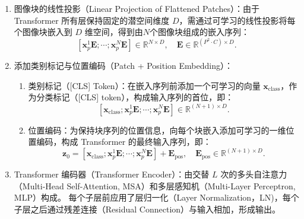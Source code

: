 \begin{enumerate}[label={（\arabic*）}, leftmargin=2em, labelsep=0.5em, itemsep=0pt]
该二维块序列经下述线性投影、类别标记与位置编码处理后，才构成 Transformer 编码器的实际输入 $\boldsymbol{z}_0$。
    \item 图像块的线性投影（Linear Projection of Flattened Patches）：由于 Transformer 所有层保持固定的潜空间维度 $D$，需通过可学习的线性投影将每个图像块嵌入到 $D$ 维空间，得到由$N$个图像块组成的嵌入序列：
    \begin{equation}
        \left[\boldsymbol{x}_p^1 \boldsymbol{E}; \cdots ; \boldsymbol{x}_p^N \boldsymbol{E}\right] \in \mathbb{R}^{N \times D}, \quad \boldsymbol{E} \in \mathbb{R}^{(P^2 \cdot C) \times D}.
    \end{equation}
    \item 添加类别标记与位置编码（Patch + Position Embedding）：
    \begin{enumerate}[label={（\alph*）}, leftmargin=2em, labelsep=0.5em, itemsep=0pt]
\item 类别标记（[CLS] Token）：在嵌入序列前添加一个可学习的向量 $\boldsymbol{x}_{\text{class}}$，作为分类标记（[CLS] token），构成输入序列的首位，即：
\begin{equation}
    \left[\boldsymbol{x}_{\text{class}}; \boldsymbol{x}_p^1 \boldsymbol{E}; \cdots ; \boldsymbol{x}_p^N \boldsymbol{E}\right] \in \mathbb{R}^{\left(N+1\right) \times D}.
\end{equation}
    \item 位置编码：为保持块序列的位置信息，向每个块嵌入添加可学习的一维位置编码，构成 Transformer 的最终输入序列，即：
    \begin{equation}
        \boldsymbol{z}_0 = \left[\boldsymbol{x}_{\text{class}}; \boldsymbol{x}_p^1 \boldsymbol{E}; \cdots ; \boldsymbol{x}_p^N \boldsymbol{E}\right] + \boldsymbol{E}_{\text{pos}}, \quad \boldsymbol{E}_{\text{pos}} \in \mathbb{R}^{(N+1) \times D}.
    \label{eq:pos-emb}
    \end{equation}
    \end{enumerate}
    \item Transformer 编码器（Transformer Encoder）：由交替 $L$ 次的多头自注意力（Multi-Head Self-Attention, MSA）和多层感知机（Multi-Layer Perceptron, MLP）构成。
    每个子层前应用了层归一化（Layer Normalization，LN)，每个子层之后通过残差连接（Residual Connection）与输入相加，形成输出。


\end{enumerate}
